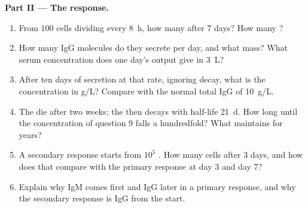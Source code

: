 \begin{problem}
\medskip
\noindent\textbf{Part II --- The response.}
\begin{enumerate}[resume]
  \item From $100$ cells dividing every \qty{8}{h}, how many after $7$
        days? How many ?
  \item How many IgG molecules do they secrete per day, and what mass?
        What serum concentration does one day's output give in
        \qty{3}{L}?
  \item After ten days of secretion at that rate, ignoring decay, what
        is the concentration in g/L? Compare with the normal total IgG
        of \qty{10}{g/L}.
  \item The  die after two weeks; the  then decays
        with half-life \qty{21}{d}. How long until the concentration of
        question 9 falls a hundredfold? What maintains  for
        years?
  \item A secondary response starts from $10^{5}$ . How
        many cells after $3$ days, and how does that compare with the
        primary response at day 3 and day 7?
  \item Explain why IgM comes first and IgG later in a primary
        response, and why the secondary response is IgG from the start.
\end{enumerate}


\end{problem}
